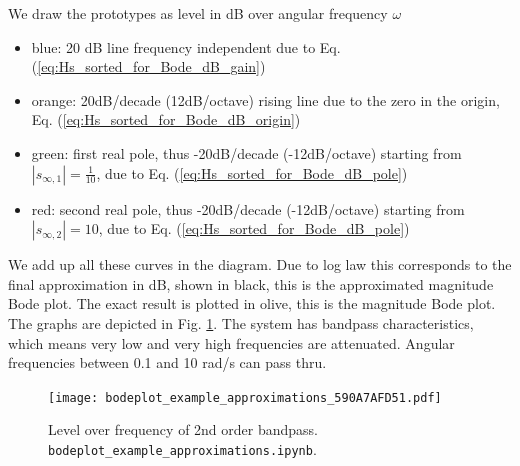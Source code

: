 \documentclass[11pt,a4paper,DIV=12]{scrartcl}
\numberwithin{equation}{section}
\numberwithin{figure}{section}
\newcommand{\eq}[1]{Eq. (\ref{#1})} %
\newcommand{\fig}[1]{Fig. \ref{#1}} %
\begin{document}
\begin{Loesung}

We draw the prototypes as level in dB over angular frequency $\omega$
\begin{itemize}
\item blue: 20 dB line frequency independent due to \eq{eq:Hs_sorted_for_Bode_dB_gain}
\item orange: 20dB/decade (12dB/octave) rising line due to the zero in the origin,
\eq{eq:Hs_sorted_for_Bode_dB_origin}
\item green: first real pole, thus -20dB/decade (-12dB/octave) starting from $|s_{\infty,1}| = \frac{1}{10}$, due to
\eq{eq:Hs_sorted_for_Bode_dB_pole}
\item red: second real pole, thus -20dB/decade (-12dB/octave) starting from $|s_{\infty,2}| = 10$, due to
\eq{eq:Hs_sorted_for_Bode_dB_pole}
\end{itemize}
We add up all these curves in the diagram. Due to log law this corresponds to the final approximation
in dB, shown in black, this is the approximated magnitude Bode plot.
The exact result is plotted in olive, this is the magnitude Bode plot.
The graphs are depicted in \fig{fig:bodeplot_example_approximations_590A7AFD51}.
The system has bandpass characteristics, which means very low and very high
frequencies are attenuated. Angular frequencies between 0.1 and 10 rad/s can pass
thru.
\end{Loesung}

\begin{figure}[h!]
\centering
\texttt{[image: bodeplot\_example\_approximations\_590A7AFD51.pdf]}
\caption{Level over frequency of 2nd order bandpass.
\texttt{bodeplot\_example\_approximations.ipynb}.}
\label{fig:bodeplot_example_approximations_590A7AFD51}
\end{figure}
















\clearpage
\end{document}
